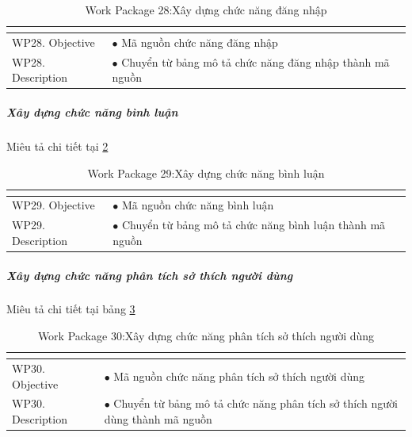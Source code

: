 \documentclass[a4paper]{book}
\begin{document}
\begin{table}[h!]
	\begin{center}
		\begin{tabular}{|p{4cm}|p{10cm}|}
			\hline
			\multicolumn{2}{|c|}{\cellcolor[HTML]{363636}{\color[HTML]{FFFFFF}Work package 28: Xây dựng chức năng đăng nhập}}\\
			\hline
			\multirow{1}{*}{WP28. Objective} & $\bullet$ Mã nguồn chức năng đăng nhập\\
			\hline
			\multirow{1}{*}{WP28. Description} & $\bullet$ Chuyển từ bảng mô tả chức năng đăng nhập thành mã nguồn \\
			\hline
		\end{tabular}
		\caption{Work Package 28:Xây dựng chức năng đăng nhập}
		\label{table:frontend_xd_cn_dangnhap}
	\end{center}
\end{table}
\subparagraph{Xây dựng chức năng bình luận} Miêu tả chi tiết tại \ref{table:frontend_xd_cn_binhluan}
\begin{table}[h!]
	\begin{center}
		\begin{tabular}{|p{4cm}|p{10cm}|}
			\hline
			\multicolumn{2}{|c|}{\cellcolor[HTML]{363636}{\color[HTML]{FFFFFF}Work package 29: Xây dựng chức năng bình luận}}\\
			\hline
			\multirow{1}{*}{WP29. Objective} & $\bullet$ Mã nguồn chức năng bình luận\\
			\hline
			\multirow{1}{*}{WP29. Description} & $\bullet$ Chuyển từ bảng mô tả chức năng bình luận thành mã nguồn \\
			\hline
		\end{tabular}
		\caption{Work Package 29:Xây dựng chức năng bình luận}
		\label{table:frontend_xd_cn_binhluan}
	\end{center}
\end{table}
\subparagraph{Xây dựng chức năng phân tích sở thích người dùng} Miêu tả chi tiết tại bảng \ref{table:frontend_xd_cn_thoiquen}
\begin{table}[h!]
	\begin{center}
		\begin{tabular}{|p{4cm}|p{10cm}|}
			\hline
			\multicolumn{2}{|c|}{\cellcolor[HTML]{363636}{\color[HTML]{FFFFFF}Work package 30: Xây dựng chức năng phân tích sở thích người dùng}}\\
			\hline
			\multirow{1}{*}{WP30. Objective} & $\bullet$ Mã nguồn chức năng phân tích sở thích người dùng\\
			\hline
			\multirow{1}{*}{WP30. Description} & $\bullet$ Chuyển từ bảng mô tả chức năng phân tích sở thích người dùng thành mã nguồn \\
			\hline
		\end{tabular}
		\caption{Work Package 30:Xây dựng chức năng phân tích sở thích người dùng}
		\label{table:frontend_xd_cn_thoiquen}
	\end{center}
\end{table}
\end{document}
